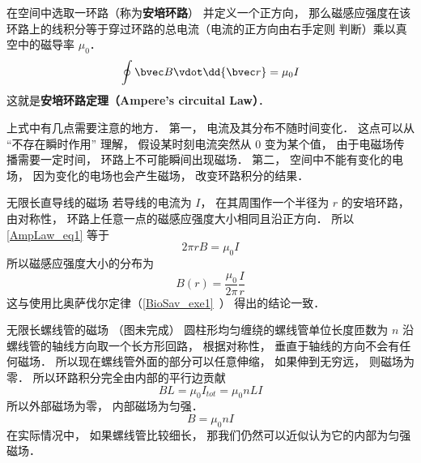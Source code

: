 
\begin{issues}
\end{issues}

在空间中选取一环路（称为\textbf{安培环路}） 并定义一个正方向， 那么磁感应强度在该环路上的线积分等于穿过环路的总电流（电流的正方向由右手定则 判断）乘以真空中的磁导率 $\mu_0$．
\begin{equation}\label{AmpLaw_eq1}
\oint \bvec B \vdot \dd{\bvec r} = \mu_0 I
\end{equation}
这就是\textbf{安培环路定理（Ampere's circuital Law）}．

上式中有几点需要注意的地方． 第一， 电流及其分布不随时间变化． 这点可以从 “不存在瞬时作用” 理解， 假设某时刻电流突然从 0 变为某个值， 由于电磁场传播需要一定时间， 环路上不可能瞬间出现磁场． 第二， 空间中不能有变化的电场， 因为变化的电场也会产生磁场， 改变环路积分的结果．%

\begin{example}{无限长直导线的磁场}\label{AmpLaw_ex1}
若导线的电流为 $I$， 在其周围作一个半径为 $r$ 的安培环路， 由对称性， 环路上任意一点的磁感应强度大小相同且沿正方向． 所以\autoref{AmpLaw_eq1} 等于
\begin{equation}
2\pi r B = \mu_0 I
\end{equation}
所以磁感应强度大小的分布为
\begin{equation}
B(r) = \frac{\mu_0}{2\pi} \frac Ir
\end{equation}
这与使用比奥萨伐尔定律（\autoref{BioSav_exe1}~） 得出的结论一致．
\end{example}

\begin{example}{无限长螺线管的磁场}\label{AmpLaw_ex2}
（图未完成） 
圆柱形均匀缠绕的螺线管单位长度匝数为 $n$ 沿螺线管的轴线方向取一个长方形回路， 根据对称性， 垂直于轴线的方向不会有任何磁场． 所以现在螺线管外面的部分可以任意伸缩， 如果伸到无穷远， 则磁场为零． 所以环路积分完全由内部的平行边贡献
\begin{equation}
BL = \mu_0 I_{tot} = \mu_0 nLI
\end{equation}
所以外部磁场为零， 内部磁场为匀强．
\begin{equation}
B = \mu_0 nI
\end{equation}
在实际情况中， 如果螺线管比较细长， 那我们仍然可以近似认为它的内部为匀强磁场．
\end{example}

